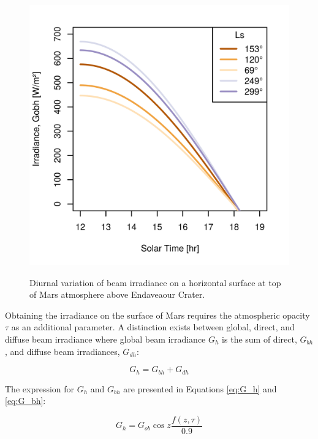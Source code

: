 \begin{figure}[h]
  \centering
  \hypersetup{linkcolor=captionTextColor}
  \includegraphics[width=0.8\linewidth]{sections/martian-environment/plots/gobh-diurnal-over-endaveaour-crater.png}\\
  \caption[Diurnal variation of beam irradiance on a horizontal surface at top of Mars atmosphere above Endaveaour Crater]
  {Diurnal variation of beam irradiance on a horizontal surface at top of Mars atmosphere above Endaveaour Crater.}
  \label{fig:plot:diurnal-variation-of-beam-irradiance-on-a-horizontal-surface-at-top-of-mars-atmosphere}
\end{figure}

Obtaining the irradiance on the surface of Mars requires the atmospheric opacity $\tau$ as an additional parameter. A distinction exists between global, direct, and diffuse beam irradiance where global beam irradiance $G_{h}$ is the sum of direct, $G_{bh}$, and diffuse beam irradiances, $G_{dh}$:


\begin{equation}
  \label{eq:G_h_1}
  G_{h} = G_{bh} + G_{dh}
\end{equation}

The expression for $G_{h}$ and $G_{bh}$ are presented in Equations \ref{eq:G_h} and \ref{eq:G_bh}:

\begin{equation}
  \label{eq:G_h_2}
  G_{h} = G_{ob}\cos{z}\frac{f(z,\tau)}{0.9}
\end{equation}

